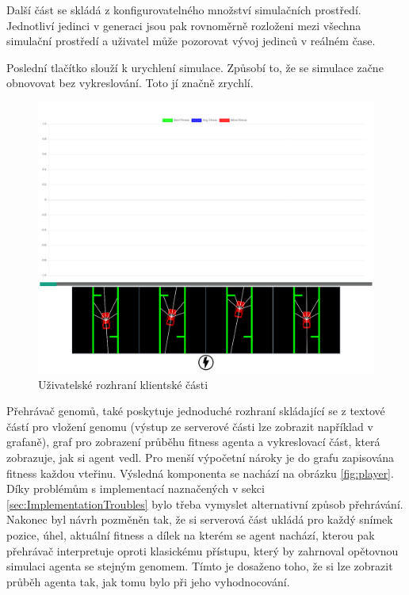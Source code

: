 Další část se skládá z konfigurovatelného množství simulačních prostředí. Jednotliví jedinci v generaci jsou pak rovnoměrně rozloženi mezi všechna simulační prostředí a uživatel může pozorovat vývoj jedinců v reálném čase.

Poslední tlačítko slouží k urychlení simulace. Způsobí to, že se simulace začne obnovovat bez vykreslování. Toto jí značně zrychlí.

\begin{figure}[h!]
	\centering
	\includegraphics[width=0.6\linewidth]{visualization}
	\caption{Uživatelské rozhraní klientské části}
	\label{fig:visualization}
\end{figure}

Přehrávač genomů, také poskytuje jednoduché rozhraní skládající se z textové částí pro vložení genomu (výstup ze serverové části lze zobrazit například v grafaně), graf pro zobrazení průběhu fitness agenta a vykreslovací část, která zobrazuje, jak si agent vedl. Pro menší výpočetní nároky je do grafu zapisována fitness každou vteřinu.  Výsledná komponenta se nachází na obrázku \ref{fig:player}.\\
Díky problémům s implementací naznačených v sekci \ref{sec:ImplementationTroubles} bylo třeba vymyslet alternativní způsob přehrávání. Nakonec byl návrh pozměněn tak, že si serverová část ukládá pro každý snímek pozice, úhel, aktuální fitness a dílek na kterém se agent nachází, kterou pak přehrávač interpretuje oproti klasickému přístupu, který by zahrnoval opětovnou simulaci agenta se stejným genomem. Tímto je dosaženo toho, že si lze zobrazit průběh agenta tak, jak tomu bylo při jeho vyhodnocování.

